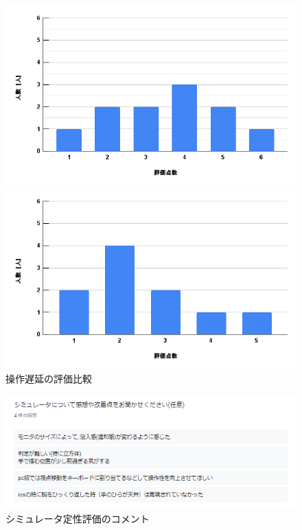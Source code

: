\documentclass{ltjsreport}
\begin{document}
		\begin{figure}[H]
		\centering
		\begin{minipage}{0.45\columnwidth}
		\centering
		\includegraphics[width = \columnwidth]{../figs/PC-3.png}
		\end{minipage}
		\hspace{0.04\columnwidth}
		\begin{minipage}{0.45\columnwidth}
		\centering
		\includegraphics[width = \columnwidth]{../figs/iOS-3.png}
		\end{minipage}
		\caption{操作遅延の評価比較}
		\end{figure}

		\begin{figure}[H]
		\centering
		\includegraphics[width = 12cm]{../figs/result.png}
		\caption{シミュレータ定性評価のコメント}
		\label{fig:comment}
		\end{figure}
\end{document}
